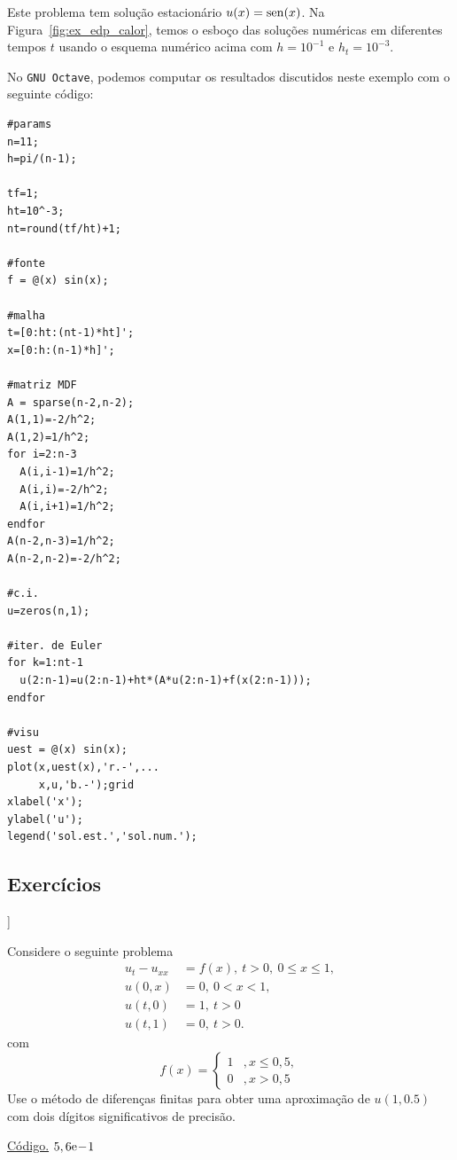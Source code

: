 \begin{ex}
Este problema tem solução estacionário $u(x) = \operatorname{sen}(x)$. Na Figura~\ref{fig:ex_edp_calor}, temos o esboço das soluções numéricas em diferentes tempos $t$ usando o esquema numérico acima com $h=10^{-1}$ e $h_t=10^{-3}$.

\ifisoctave
No \verb+GNU Octave+, podemos computar os resultados discutidos neste exemplo com o seguinte código:
\begin{verbatim}
#params
n=11;
h=pi/(n-1);

tf=1;
ht=10^-3;
nt=round(tf/ht)+1;

#fonte
f = @(x) sin(x);

#malha
t=[0:ht:(nt-1)*ht]'; 
x=[0:h:(n-1)*h]';

#matriz MDF
A = sparse(n-2,n-2);
A(1,1)=-2/h^2;
A(1,2)=1/h^2;
for i=2:n-3
  A(i,i-1)=1/h^2;
  A(i,i)=-2/h^2;
  A(i,i+1)=1/h^2;
endfor
A(n-2,n-3)=1/h^2;
A(n-2,n-2)=-2/h^2;

#c.i.
u=zeros(n,1);

#iter. de Euler
for k=1:nt-1
  u(2:n-1)=u(2:n-1)+ht*(A*u(2:n-1)+f(x(2:n-1)));
endfor

#visu
uest = @(x) sin(x);
plot(x,uest(x),'r.-',...
     x,u,'b.-');grid
xlabel('x');
ylabel('u');
legend('sol.est.','sol.num.');
\end{verbatim}
\fi
\end{ex}

\subsection*{Exercícios}

\begin{flushleft}
  [[tag:revisar]]
\end{flushleft}

\begin{exer}
  Considere o seguinte problema
  \begin{align}
    u_t - u_{xx} &= f(x),~t>0,~0\leq x \leq 1,\\
    u(0,x) &= 0,~0<x<1,\\
    u(t,0) &= 1,~t>0\\
    u(t,1) &= 0,~t>0.
  \end{align}
com
\begin{equation}
  f(x) = \left\{
    \begin{array}{ll}
      1 &, x\leq 0,5,\\
      0 &, x>0,5
    \end{array}
\right.
\end{equation}
Use o método de diferenças finitas para obter uma aproximação de $u(1,0.5)$ com dois dígitos significativos de precisão.
\end{exer}
\begin{resp}
  \ifisoctave 
  \href{https://github.com/phkonzen/notas/blob/master/src/MatematicaNumerica/cap_edp/dados/exer_edp_calor_1/exer_edp_calor_1.m}{Código.} 
  \fi
  $5,6\mathrm{e}\!-\!1$
\end{resp}

